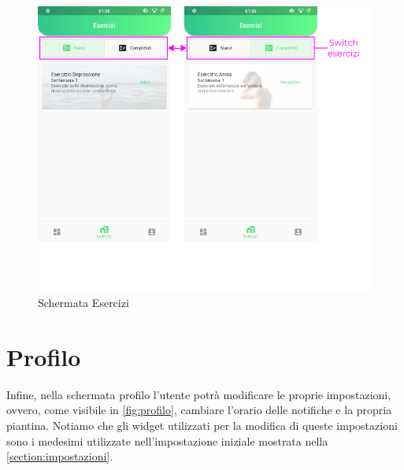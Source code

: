 \begin{figure}[h!]
\centering
\includegraphics[width=\textwidth]{img/schermata_esercizi}
\caption{Schermata Esercizi}
\label{fig:schermata_esercizi}
\end{figure}

\newpage
\section{Profilo}
Infine, nella schermata profilo l'utente potrà modificare le proprie impostazioni, ovvero, come visibile in \autoref{fig:profilo}, cambiare l'orario delle notifiche e la propria piantina. Notiamo che gli widget utilizzati per la modifica di queste impostazioni sono i medesimi utilizzate nell'impostazione iniziale mostrata nella \autoref{section:impostazioni}.

